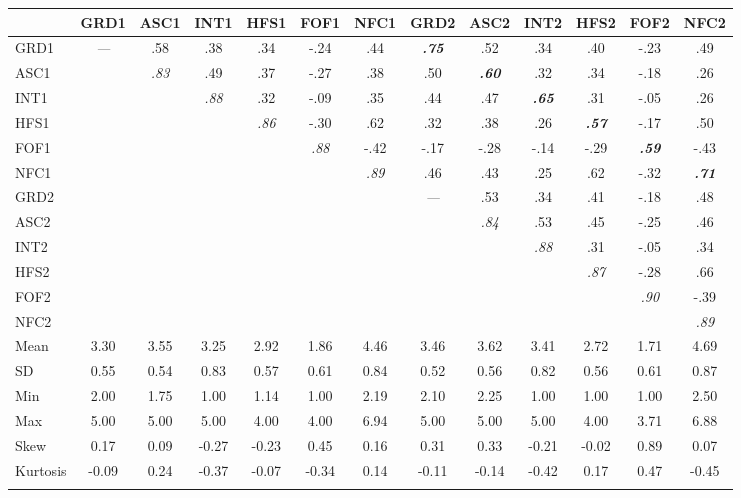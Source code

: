 \documentclass[
  man]{apa6}
\begin{document}
\begin{table}[tbp]
\begin{center}
\begin{threeparttable}
{\begin{tabular}{lcccccccccccc}
\toprule
 & \multicolumn{1}{c}{GRD1} & \multicolumn{1}{c}{ASC1} & \multicolumn{1}{c}{INT1} & \multicolumn{1}{c}{HFS1} & \multicolumn{1}{c}{FOF1} & \multicolumn{1}{c}{NFC1} & \multicolumn{1}{c}{GRD2} & \multicolumn{1}{c}{ASC2} & \multicolumn{1}{c}{INT2} & \multicolumn{1}{c}{HFS2} & \multicolumn{1}{c}{FOF2} & \multicolumn{1}{c}{NFC2}\\
\midrule
GRD1 & \textit{—} & .58 & .38 & .34 & -.24 & .44 & \textbf{\textit{.75}} & .52 & .34 & .40 & -.23 & .49\\
ASC1 &  & \textit{.83} & .49 & .37 & -.27 & .38 & .50 & \textbf{\textit{.60}} & .32 & .34 & -.18 & .26\\
INT1 &  &  & \textit{.88} & .32 & -.09 & .35 & .44 & .47 & \textbf{\textit{.65}} & .31 & -.05 & .26\\
HFS1 &  &  &  & \textit{.86} & -.30 & .62 & .32 & .38 & .26 & \textbf{\textit{.57}} & -.17 & .50\\
FOF1 &  &  &  &  & \textit{.88} & -.42 & -.17 & -.28 & -.14 & -.29 & \textbf{\textit{.59}} & -.43\\
NFC1 &  &  &  &  &  & \textit{.89} & .46 & .43 & .25 & .62 & -.32 & \textbf{\textit{.71}}\\
GRD2 &  &  &  &  &  &  & \textit{—} & .53 & .34 & .41 & -.18 & .48\\
ASC2 &  &  &  &  &  &  &  & \textit{.84} & .53 & .45 & -.25 & .46\\
INT2 &  &  &  &  &  &  &  &  & \textit{.88} & .31 & -.05 & .34\\
HFS2 &  &  &  &  &  &  &  &  &  & \textit{.87} & -.28 & .66\\
FOF2 &  &  &  &  &  &  &  &  &  &  & \textit{.90} & -.39\\
NFC2 &  &  &  &  &  &  &  &  &  &  &  & \textit{.89}\\ \midrule
Mean & 3.30 & 3.55 & 3.25 & 2.92 & 1.86 & 4.46 & 3.46 & 3.62 & 3.41 & 2.72 & 1.71 & 4.69\\
SD & 0.55 & 0.54 & 0.83 & 0.57 & 0.61 & 0.84 & 0.52 & 0.56 & 0.82 & 0.56 & 0.61 & 0.87\\
Min & 2.00 & 1.75 & 1.00 & 1.14 & 1.00 & 2.19 & 2.10 & 2.25 & 1.00 & 1.00 & 1.00 & 2.50\\
Max & 5.00 & 5.00 & 5.00 & 4.00 & 4.00 & 6.94 & 5.00 & 5.00 & 5.00 & 4.00 & 3.71 & 6.88\\
Skew & 0.17 & 0.09 & -0.27 & -0.23 & 0.45 & 0.16 & 0.31 & 0.33 & -0.21 & -0.02 & 0.89 & 0.07\\
Kurtosis & -0.09 & 0.24 & -0.37 & -0.07 & -0.34 & 0.14 & -0.11 & -0.14 & -0.42 & 0.17 & 0.47 & -0.45\\
\bottomrule
\addlinespace
\end{tabular}

}
\end{threeparttable}
\end{center}
\end{table}
\end{document}
